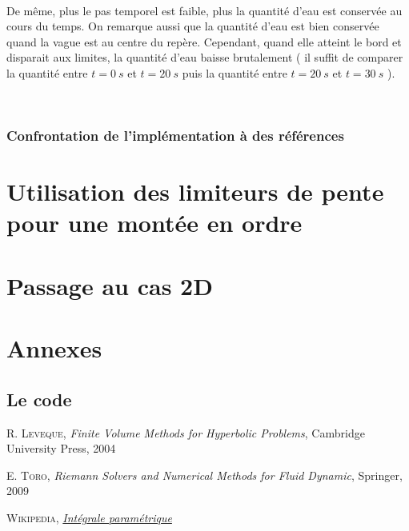 \documentclass[
11pt, %
francais, %
singlespacing, %
headsepline, %
]{MastersDoctoralThesis} %
\renewcommand{\thesection}{\arabic{section}}
\begin{document}
\

De même, plus le pas temporel est faible, plus la quantité d'eau est conservée au cours du temps. On remarque aussi que la quantité d'eau est bien conservée quand la vague est au centre du repère. Cependant, quand elle atteint le bord et disparait aux limites, la quantité d'eau baisse brutalement ( il suffit de comparer la quantité entre $t=0\ s$ et $t=20\ s$ puis la quantité entre $t=20\ s$ et $t=30\ s$ ). 

\

\subsubsection{Confrontation de l'implémentation à des références}





\section{Utilisation des limiteurs de pente pour une montée en ordre}

\section{Passage au cas 2D}

\newpage
\renewcommand{\thesection}{\Alph{section}}
\appendix
\section{Annexes}
\subsection{Le code}



\begin{thebibliography}{9}

 R. \textsc{Leveque},
\textit{Finite Volume Methods for Hyperbolic Problems}, Cambridge University Press, 2004

 E. \textsc{Toro},
\textit{Riemann Solvers and Numerical Methods for Fluid Dynamic}, Springer, 2009

 \textsc{Wikipedia},
\href{https://fr.wikipedia.org/wiki/Intégrale_paramétrique#Dérivabilité}{ \textit{Intégrale paramétrique}}

\end{thebibliography}

\end{document}
